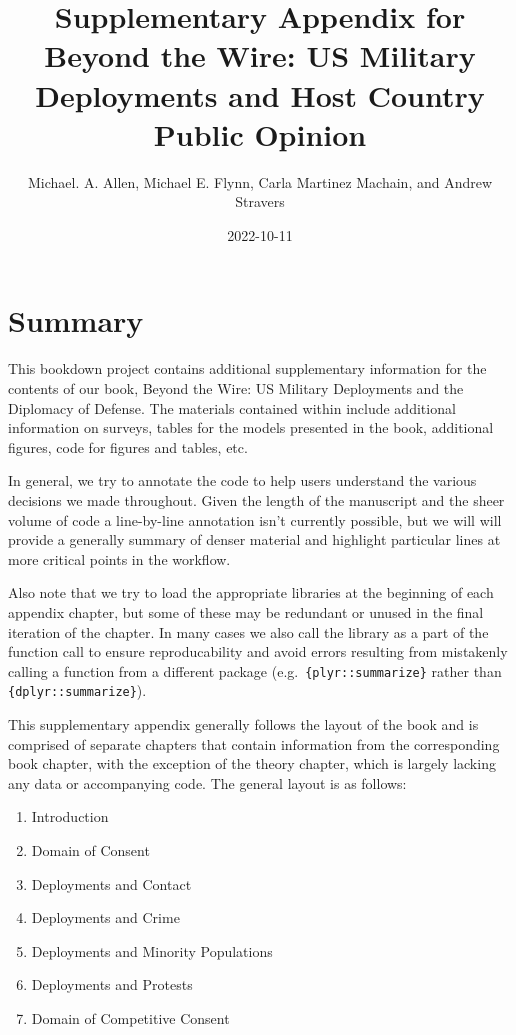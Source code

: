 \documentclass[
]{book}
\title{Supplementary Appendix for Beyond the Wire: US Military Deployments and Host Country Public Opinion}
\author{Michael. A. Allen, Michael E. Flynn, Carla Martinez Machain, and Andrew Stravers}
\date{2022-10-11}
\providecommand{\tightlist}{%
  \setlength{\itemsep}{0pt}\setlength{\parskip}{0pt}}
\theoremstyle{definition}
\theoremstyle{definition}
\theoremstyle{definition}
\theoremstyle{definition}
\theoremstyle{remark}
\begin{document}
\maketitle

{
\setcounter{tocdepth}{1}
\tableofcontents
}
\hypertarget{summary}{%
\chapter*{Summary}\label{summary}}

This bookdown project contains additional supplementary information for the contents of our book, Beyond the Wire: US Military Deployments and the Diplomacy of Defense. The materials contained within include additional information on surveys, tables for the models presented in the book, additional figures, code for figures and tables, etc.

In general, we try to annotate the code to help users understand the various decisions we made throughout. Given the length of the manuscript and the sheer volume of code a line-by-line annotation isn't currently possible, but we will will provide a generally summary of denser material and highlight particular lines at more critical points in the workflow.

Also note that we try to load the appropriate libraries at the beginning of each appendix chapter, but some of these may be redundant or unused in the final iteration of the chapter. In many cases we also call the library as a part of the function call to ensure reproducability and avoid errors resulting from mistakenly calling a function from a different package (e.g.~\texttt{\{plyr::summarize\}} rather than \texttt{\{dplyr::summarize\}}).

This supplementary appendix generally follows the layout of the book and is comprised of separate chapters that contain information from the corresponding book chapter, with the exception of the theory chapter, which is largely lacking any data or accompanying code. The general layout is as follows:

\begin{enumerate}
\def\labelenumi{\arabic{enumi}.}
\tightlist
\item
  Introduction
\item
  Domain of Consent
\item
  Deployments and Contact
\item
  Deployments and Crime
\item
  Deployments and Minority Populations
\item
  Deployments and Protests
\item
  Domain of Competitive Consent
\end{enumerate}
\end{document}
